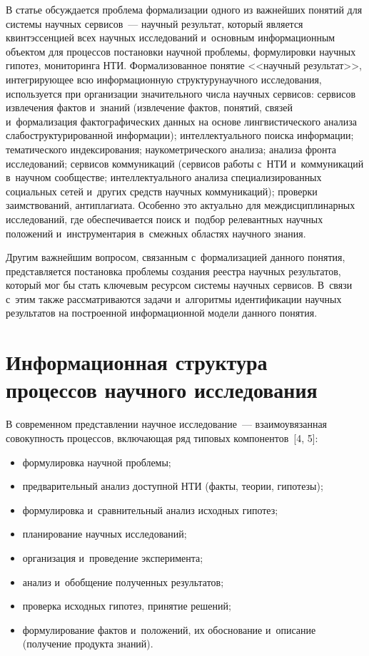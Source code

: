 \begin{multicols}{2}
     В статье обсуждается проблема формализации одного из важнейших 
понятий для системы научных сервисов~--- научный результат, который 
является квинтэссенцией всех научных исследований и~основным 
информационным объектом для процессов постановки научной проб\-ле\-мы, 
формулировки научных гипотез, мониторинга НТИ. 
Формализованное понятие <<научный результат>>, 
интегрирующее всю информационную структуру\linebreak научного исследования, 
используется при организации значительного числа научных сервисов: 
сервисов извлечения фактов и~знаний (извлечение фактов,
 понятий, связей 
и~формализация фактографических данных на основе лингвистического 
анализа слабоструктурированной информации); интеллектуального поиска 
информации; тематического индексирования; наукометрического анализа; 
анализа фронта исследований; сервисов коммуникаций (сервисов работы 
с~НТИ и~коммуникаций в~научном сообществе; интеллектуального анализа 
специализированных социальных сетей и~других средств научных 
коммуникаций); проверки заимствований, антиплагиата. Особенно это 
актуально для междисциплинарных исследований, где обеспечивается поиск и~подбор релевантных научных положений и~инструментария в~смежных 
областях научного знания.
     
     Другим важнейшим вопросом, связанным с~формализацией данного 
понятия, представляется постановка проблемы создания реестра научных 
результатов, который мог бы стать ключевым ресурсом системы научных 
сервисов. В~связи с~этим также рассматриваются задачи и~алгоритмы 
идентификации научных результатов на построенной информационной 
модели данного понятия.

\vspace*{-6pt}
     
\section{Информационная структура процессов научного 
исследования}

     В современном представлении научное исследование~--- 
взаимоувязанная совокупность процессов, включающая ряд типовых 
компонентов~[4, 5]: 
     \begin{itemize}
\item формулировка научной проблемы;
\item предварительный анализ доступной НТИ
(факты, теории, гипотезы);
\item формулировка и~сравнительный анализ исходных гипотез; 
\item планирование научных исследований; 
\item организация и~проведение эксперимента; 
\item анализ и~обобщение полученных результатов;
\item проверка исходных гипотез, принятие решений; 
\item формулирование фактов и~положений, их обосно\-ва\-ние 
и~описание (получение продукта знаний).
    \end{itemize}
    

\end{multicols}
